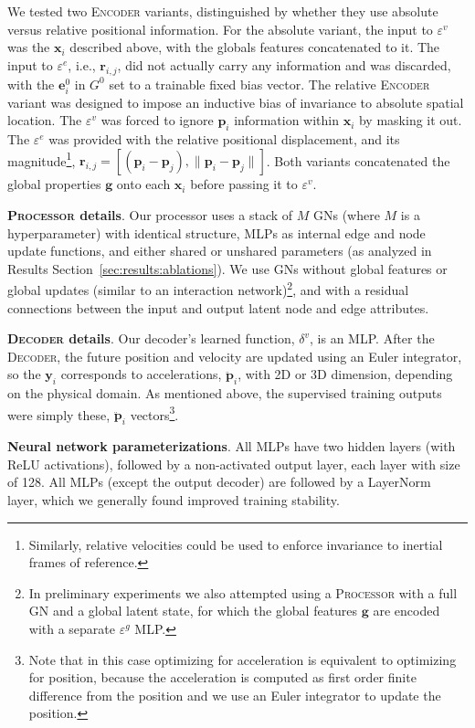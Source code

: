 \documentclass{article}
\newcommand{\xhdr}[1]{{\noindent\bfseries #1}.}
\newcommand{\norm}[1]{\lVert#1\rVert}
\newcommand{\encoder}{\textsc{Encoder}}
\newcommand{\processor}{\textsc{Processor}}
\newcommand{\decoder}{\textsc{Decoder}}
\begin{document}
We tested two \encoder{} variants, distinguished by whether they use absolute versus relative positional information. For the absolute variant, the input to $\varepsilon^v$ was the $\mathbf{x}_i$ described above, with the globals features concatenated to it. The input to $\varepsilon^e$, i.e., $\mathbf{r}_{i,j}$, did not actually carry any information and was discarded, with the $\mathbf{e}^0_i$ in $G^0$ set to a trainable fixed bias vector. The relative \encoder{} variant was designed to impose an inductive bias of invariance to absolute spatial location. The $\varepsilon^v$ was forced to ignore $\mathbf{p}_i$ information within $\mathbf{x}_i$ by masking it out. The $\varepsilon^e$ was provided with the relative positional displacement, and its magnitude\footnote{Similarly, relative velocities could be used to enforce invariance to inertial frames of reference.}, ${\mathbf{r}_{i,j} = [(\mathbf{p}_i - \mathbf{p}_j), \norm{\mathbf{p}_i - \mathbf{p}_j}]}$. Both variants concatenated the global properties $\mathbf{g}$ onto each $\mathbf{x}_i$ before passing it to $\varepsilon^v$.

\xhdr{\processor{} details} Our processor uses a stack of $M$ GNs (where $M$ is a hyperparameter) with identical structure, MLPs as internal edge and node update functions, and either shared or unshared parameters (as analyzed in Results Section~\ref{sec:results:ablations}). We use GNs without global features or global updates (similar to an interaction network)\footnote{In preliminary experiments we also attempted using a \processor{} with a full GN and a global latent state, for which the global features $\mathbf{g}$ are encoded with a separate $\varepsilon^g$ MLP.}, and with a residual connections between the input and output latent node and edge attributes.

\xhdr{\decoder{} details} Our decoder's learned function, $\delta^v$, is an MLP. After the \decoder{}, the future position and velocity are updated using an Euler integrator, so the $\mathbf{y}_i$ corresponds to accelerations, $\ddot{\mathbf{p}}_i$, with 2D or 3D dimension, depending on the physical domain. As mentioned above, the supervised training outputs were simply these, $\ddot{\mathbf{p}}_i$ vectors\footnote{Note that in this case optimizing for acceleration is equivalent to optimizing for position, because the acceleration is computed as first order finite difference from the position and we use an Euler integrator to update the position.}.


\xhdr{Neural network parameterizations} All MLPs have two hidden layers (with ReLU activations), followed by a non-activated output layer, each layer with size of 128. All MLPs (except the output decoder) are followed by a LayerNorm~\cite{ba2016layer} layer, which we generally found improved training stability.
\end{document}
